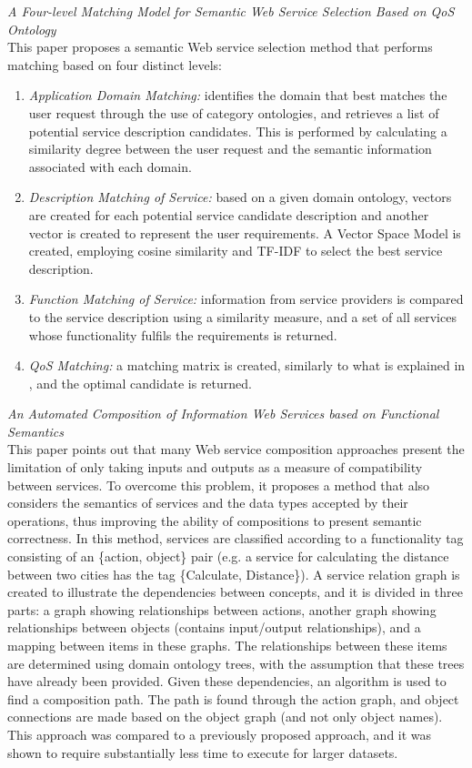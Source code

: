 \textit{A Four-level Matching Model for Semantic Web Service Selection Based on QoS Ontology \cite{guo2010four}}\\
This paper proposes a semantic Web service selection method that performs matching based on four distinct levels:
\begin{enumerate}
 \item \textit{Application Domain Matching:} identifies the domain that best matches the user request through the use of category ontologies, and retrieves a list of potential service description candidates. This is performed by calculating a similarity degree between the user request and the semantic information associated with each domain.
 \item \textit{Description Matching of Service:} based on a given domain ontology, vectors are created for each potential service candidate description and another vector is created to represent the user requirements. A Vector Space Model is created, employing cosine similarity and TF-IDF to select the best service description.
 \item \textit{Function Matching of Service:} information from service providers is compared to the service description using a similarity measure, and a set of all services whose functionality fulfils the requirements is returned.
 \item \textit{QoS Matching:} a matching matrix is created, similarly to what is explained in \cite{wang2006qos}, and the optimal candidate is returned.
\end{enumerate}

\textit{An Automated Composition of Information Web Services based on Functional Semantics \cite{shin2007automated}}\\
This paper points out that many Web service composition approaches present the limitation of only taking inputs and
outputs as a measure of compatibility between services. To overcome this problem, it proposes a method that also
considers the semantics of services and the data types accepted by their operations, thus improving the ability of
compositions to present semantic correctness. In this method, services are classified according to a functionality
tag consisting of an \{action, object\} pair (e.g. a service for calculating the distance between two cities has
the tag \{Calculate, Distance\}). A service relation graph is created to illustrate the dependencies between concepts,
and it is divided in three parts: a graph showing relationships between actions, another graph showing relationships
between objects (contains input/output relationships), and a mapping between items in these graphs. The relationships
between these items are determined using domain ontology trees, with the assumption that these trees have already
been provided. Given these dependencies, an algorithm is used to find a composition path. The path is found through
the action graph, and object connections are made based on the object graph (and not only object names). This approach
was compared to a previously proposed approach, and it was shown to require substantially less time to execute for
larger datasets.

